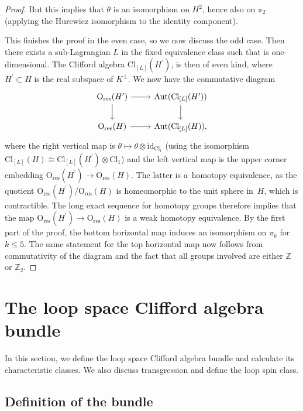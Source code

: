 \documentclass[pdftex]{sigma}
\numberwithin{equation}{section}
\newcommand{\Z}{\mathbb{Z}}
\newcommand{\Cl}{\mathrm{Cl}}
\newcommand{\id}{\mathrm{id}}
\newcommand{\res}{\mathrm{res}}
\newcommand{\Aut}{\mathrm{Aut}}
\renewcommand{\O}{\mathrm{O}}
\begin{document}
\begin{proof}
But this implies that $\theta$ is an isomorphism on $H^2$, hence also on $\pi_2$ (applying the Hurewicz isomorphism to the identity component).

This finishes the proof in the even case, so we now discuss the odd case.
Then there exists a sub-Lagrangian $L$ in the fixed equivalence class such that  is one-dimensional.
The Clifford algebra $\Cl_{[L]}(H^\prime)$, is then of even kind, where $H^\prime \subset H$ is the real subspace of $K^\perp$.
We now have the commutative diagram
\begin{equation*}
\begin{tikzcd}
 \O_{\res}(H^\prime) \ar[r] \ar[d]& \Aut(\Cl_{[L]}(H^\prime)) \ar[d]\\
 \O_{\res}(H) \ar[r]& \Aut(\Cl_{[L]}(H)),
\end{tikzcd}
\end{equation*}
where the right vertical map is $\theta \mapsto \theta \otimes \id_{\Cl_1}$ (using the isomorphism $\Cl_{[L]}(H) \cong \Cl_{[L]}(H^\prime) \otimes \Cl_1$) and the left vertical map is the upper corner embedding $\O_{\res}(H^\prime) \to \O_{\res}(H)$.
The latter is a~homotopy equivalence, as the quotient $\O_{\res}(H^\prime) / \O_{\res}(H)$ is homeomorphic to the unit sphere in~$H$, which is contractible.
The long exact sequence for homotopy groups therefore implies that the map $\O_{\res}(H^\prime) \to \O_{\res}(H)$ is a weak homotopy equivalence.
By the first part of the proof, the bottom horizontal map induces an isomorphism on $\pi_k$ for $k \leq 5$.
The same statement for the top horizontal map now follows from commutativity of the diagram and the fact that all groups involved are either $\Z$ or $\Z_2$.
\end{proof}


\section{The loop space Clifford algebra bundle}\label{sec4}

In this section, we define the loop space Clifford algebra bundle and calculate its characteristic classes.
We also discuss transgression and define the loop spin class.

\subsection{Definition of the bundle} \label{SectionLoopSpaceCliffordBundle}
\end{document}
